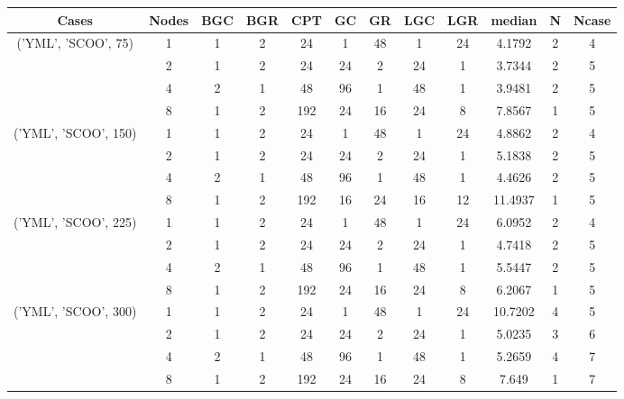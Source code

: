 \begin{tabular}{cccccccccccc}
\hline
Cases & Nodes& BGC& BGR& CPT& GC& GR& LGC& LGR& median & N & Ncase \\
\hline
\multirow{4}{*}{('YML', 'SCOO', 75)}& 1& 1& 2& 24& 1& 48& 1& 24& 4.1792& 2& 4\\
& 2& 1& 2& 24& 24& 2& 24& 1& 3.7344& 2& 5\\
& 4& 2& 1& 48& 96& 1& 48& 1& 3.9481& 2& 5\\
& 8& 1& 2& 192& 24& 16& 24& 8& 7.8567& 1& 5\\
\hline
\multirow{4}{*}{('YML', 'SCOO', 150)}& 1& 1& 2& 24& 1& 48& 1& 24& 4.8862& 2& 4\\
& 2& 1& 2& 24& 24& 2& 24& 1& 5.1838& 2& 5\\
& 4& 2& 1& 48& 96& 1& 48& 1& 4.4626& 2& 5\\
& 8& 1& 2& 192& 16& 24& 16& 12& 11.4937& 1& 5\\
\hline
\multirow{4}{*}{('YML', 'SCOO', 225)}& 1& 1& 2& 24& 1& 48& 1& 24& 6.0952& 2& 4\\
& 2& 1& 2& 24& 24& 2& 24& 1& 4.7418& 2& 5\\
& 4& 2& 1& 48& 96& 1& 48& 1& 5.5447& 2& 5\\
& 8& 1& 2& 192& 24& 16& 24& 8& 6.2067& 1& 5\\
\hline
\multirow{4}{*}{('YML', 'SCOO', 300)}& 1& 1& 2& 24& 1& 48& 1& 24& 10.7202& 4& 5\\
& 2& 1& 2& 24& 24& 2& 24& 1& 5.0235& 3& 6\\
& 4& 2& 1& 48& 96& 1& 48& 1& 5.2659& 4& 7\\
& 8& 1& 2& 192& 24& 16& 24& 8& 7.649& 1& 7\\
\hline
\end{tabular}
